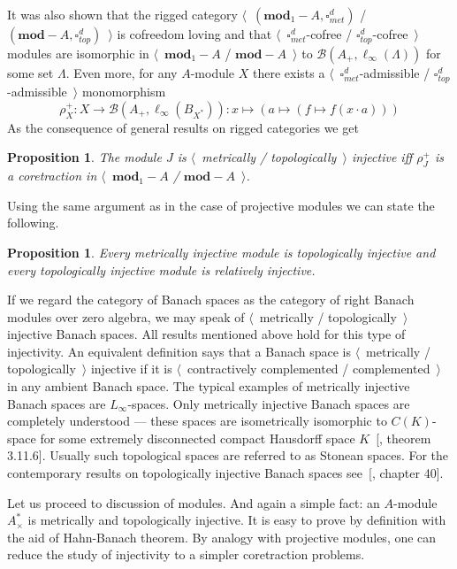 \documentclass[12pt]{article}
\newtheorem{proposition}[theorem]{Proposition}
\begin{document}
It was also shown that the rigged category
$\langle$~$(\mathbf{mod}_1-A,\square_{met}^d)$ / $(\mathbf{mod}-A,\square_{top}^d)$~$\rangle$ is
cofreedom loving and that $\langle$~$\square_{met}^d$-cofree /
$\square_{top}^d$-cofree~$\rangle$ modules are isomorphic in
$\langle$~$\mathbf{mod}_1-A$ / $\mathbf{mod}-A$~$\rangle$ to
$\mathcal{B}(A_+,\ell_\infty(\Lambda))$ for some set $\Lambda$.
Even more, for any $A$-module $X$ there exists a
$\langle$~$\square_{met}^d$-admissible / $\square_{top}^d$-admissible~$\rangle$
monomorphism
$$
    \rho_X^+:X\to\mathcal{B}(A_+,\ell_\infty(B_{X^*})):
    x\mapsto(a\mapsto(f\mapsto f(x\cdot a)))
$$
As the consequence of general results on rigged categories we get

\begin{proposition}\label{MetTopInjModViaCanonicMorph} The module $J$ is
    $\langle$~metrically / topologically~$\rangle$ injective iff $\rho_J^+$ is a
    coretraction in $\langle$~$\mathbf{mod}_1-A$ / $\mathbf{mod}-A$~$\rangle$.
\end{proposition}

Using the same argument as in the case of projective modules we can state the
following.

\begin{proposition}\label{MetInjIsTopInjAndTopInjIsRelInj} Every metrically
    injective module is topologically injective and every topologically
    injective module is relatively injective.
\end{proposition}

If we regard the category of Banach spaces as the category of right Banach
modules over zero algebra, we may speak of $\langle$~metrically /
topologically~$\rangle$ injective Banach spaces. All results mentioned above
hold for this type of injectivity. An equivalent definition says that a Banach
space is $\langle$~metrically / topologically~$\rangle$ injective if it is
$\langle$~contractively complemented / complemented~$\rangle$ in any ambient
Banach space. The typical examples of metrically injective Banach spaces are
$L_\infty$-spaces. Only metrically injective Banach spaces are completely
understood --- these spaces are isometrically isomorphic to $C(K)$-space for
some extremely disconnected compact Hausdorff space
$K$~[\cite{LaceyIsomThOfClassicBanSp}, theorem 3.11.6]. Usually such topological
spaces are referred to as Stonean spaces. For the contemporary results on
topologically injective Banach spaces see~[\cite{JohnLinHandbookGeomBanSp},
chapter 40].

Let us proceed to discussion of modules. And again a simple fact: an $A$-module
$A_\times^*$ is metrically and topologically injective. It is easy to prove by
definition with the aid of Hahn-Banach theorem. By analogy with projective
modules, one can reduce the study of injectivity to a simpler coretraction
problems.
\end{document}
